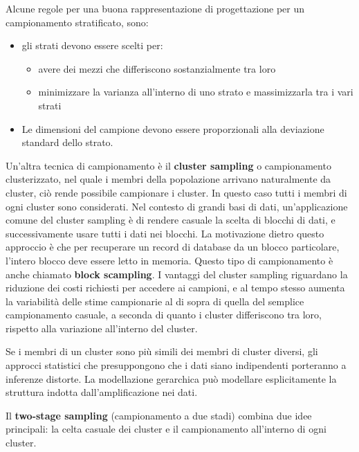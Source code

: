 \documentclass[a4paper]{extarticle}
\begin{document}
Alcune regole per una buona rappresentazione di progettazione per un campionamento stratificato, sono:
\begin{itemize}
\item gli strati devono essere scelti per:
	\begin{itemize}
	\item avere dei mezzi che differiscono sostanzialmente tra loro
	\item minimizzare la varianza all'interno di uno strato e massimizzarla tra i vari strati
	\end{itemize}
\item Le dimensioni del campione devono essere proporzionali alla deviazione standard dello strato.
\end{itemize}

Un'altra tecnica di campionamento è il \textbf{cluster sampling} o campionamento clusterizzato, nel quale i membri della popolazione arrivano naturalmente da cluster, ciò rende possibile campionare i cluster. In questo caso tutti i membri di ogni cluster sono considerati. Nel contesto di grandi basi di dati, un'applicazione comune del cluster sampling è di rendere casuale la scelta di blocchi di dati, e successivamente usare tutti i dati nei blocchi. La motivazione dietro questo approccio è che per recuperare un record di database da un blocco particolare, l'intero blocco deve essere letto in memoria. Questo tipo di campionamento è anche chiamato \textbf{block scampling}. I vantaggi del cluster sampling riguardano la riduzione dei costi richiesti per accedere ai campioni, e al tempo stesso aumenta la variabilità delle stime campionarie al di sopra di quella del semplice campionamento casuale, a seconda di quanto i cluster differiscono tra loro, rispetto alla variazione all'interno del cluster.

Se i membri di un cluster sono più simili dei membri di cluster diversi, gli approcci statistici che presuppongono che i dati siano indipendenti porteranno a inferenze distorte. La modellazione gerarchica può modellare esplicitamente la struttura indotta dall'amplificazione nei dati.

Il \textbf{two-stage sampling} (campionamento a due stadi) combina due idee principali: la celta casuale dei cluster e il campionamento all'interno di ogni cluster. 
\end{document}
